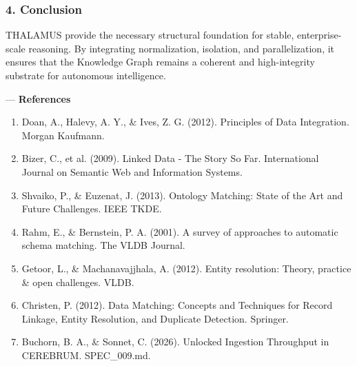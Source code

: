 \documentclass[10pt,journal,compsoc]{IEEEtran}
\begin{document}
\subsubsection{4. Conclusion}
THALAMUS provide the necessary structural foundation for stable, enterprise-scale reasoning. By integrating norma\-lization, isolation, and paral\-lelization, it ensures that the Knowledge Graph remains a coherent and high-integrity substrate for autonomous intel\-ligence.

---
\textbf{References}
\begin{enumerate}
\item Doan, A., Halevy, A. Y., \& Ives, Z. G. (2012). Principles of Data Integration. Morgan Kaufmann.
\item Bizer, C., et al. (2009). Linked Data - The Story So Far. Intern\-ational Journal on Semantic Web and Information Systems.
\item Shvaiko, P., \& Euzenat, J. (2013). Ontology Matching: State of the Art and Future Challenges. IEEE TKDE.
\item Rahm, E., \& Bernstein, P. A. (2001). A survey of approaches to automatic schema matching. The VLDB Journal.
\item Getoor, L., \& Machan\-avajjhala, A. (2012). Entity resolution: Theory, practice \& open challenges. VLDB.
\item Christen, P. (2012). Data Matching: Concepts and Techniques for Record Linkage, Entity Resolution, and Duplicate Detection. Springer.
\item Buchorn, B. A., \& Sonnet, C. (2026). Unlocked Ingestion Throughput in CEREBRUM. SPEC\_009.md.

\end{enumerate}



\end{document}
